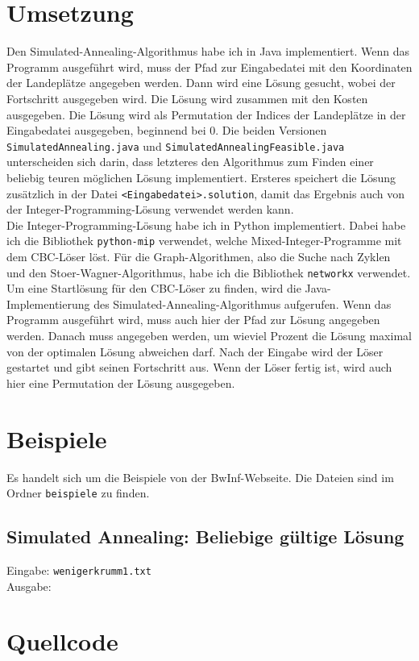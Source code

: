 \documentclass[a4paper,10pt,ngerman]{scrartcl}
\begin{document}
\section{Umsetzung}
Den Simulated-Annealing-Algorithmus habe ich in Java implementiert. Wenn das
Programm ausgeführt wird, muss der Pfad zur Eingabedatei mit den Koordinaten
der Landeplätze angegeben werden. Dann wird eine Lösung gesucht, wobei der
Fortschritt ausgegeben wird. Die Lösung wird zusammen mit den Kosten
ausgegeben. Die Lösung wird als Permutation der Indices der Landeplätze in der
Eingabedatei ausgegeben, beginnend bei 0. Die beiden Versionen
\lstinline|SimulatedAnnealing.java| und
\lstinline|SimulatedAnnealingFeasible.java| unterscheiden sich darin, dass
letzteres den Algorithmus zum Finden einer beliebig teuren möglichen Lösung
implementiert. Ersteres speichert die Lösung zusätzlich in der Datei
\lstinline|<Eingabedatei>.solution|, damit das Ergebnis auch von der
Integer-Programming-Lösung verwendet werden kann. \\ Die
Integer-Programming-Lösung habe ich in Python implementiert. Dabei habe ich die
Bibliothek \lstinline|python-mip| verwendet, welche Mixed-Integer-Programme mit
dem CBC-Löser löst. Für die Graph-Algorithmen, also die Suche nach Zyklen und
den Stoer-Wagner-Algorithmus, habe ich die Bibliothek \lstinline|networkx|
verwendet. Um eine Startlösung für den CBC-Löser zu finden, wird die
Java-Implementierung des Simulated-Annealing-Algorithmus aufgerufen. Wenn das
Programm ausgeführt wird, muss auch hier der Pfad zur Lösung angegeben werden.
Danach muss angegeben werden, um wieviel Prozent die Lösung maximal von der
optimalen Lösung abweichen darf. Nach der Eingabe wird der Löser gestartet und
gibt seinen Fortschritt aus. Wenn der Löser fertig ist, wird auch hier eine
Permutation der Lösung ausgegeben.

\section{Beispiele}
Es handelt sich um die Beispiele von der BwInf-Webseite. Die Dateien sind im Ordner
\lstinline|beispiele| zu finden.
\subsection{Simulated Annealing: Beliebige gültige Lösung}
Eingabe: \lstinline|wenigerkrumm1.txt| \\
Ausgabe:
\section{Quellcode}

\begingroup
\def\chapter*#1{}

\endgroup
\end{document}
